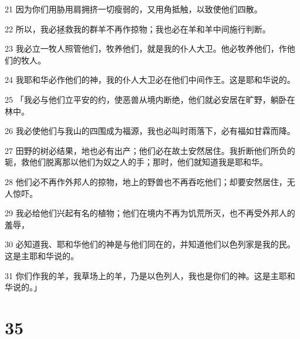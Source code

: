 \par 21 因为你们用胁用肩拥挤一切瘦弱的，又用角抵触，以致使他们四散。
\par 22 所以，我必拯救我的群羊不再作掠物；我也必在羊和羊中间施行判断。
\par 23 我必立一牧人照管他们，牧养他们，就是我的仆人大卫。他必牧养他们，作他们的牧人。
\par 24 我耶和华必作他们的神，我的仆人大卫必在他们中间作王。这是耶和华说的。
\par 25 「我必与他们立平安的约，使恶兽从境内断绝，他们就必安居在旷野，躺卧在林中。
\par 26 我必使他们与我山的四围成为福源，我也必叫时雨落下，必有福如甘霖而降。
\par 27 田野的树必结果，地也必有出产；他们必在故土安然居住。我折断他们所负的轭，救他们脱离那以他们为奴之人的手；那时，他们就知道我是耶和华。
\par 28 他们必不再作外邦人的掠物，地上的野兽也不再吞吃他们；却要安然居住，无人惊吓。
\par 29 我必给他们兴起有名的植物；他们在境内不再为饥荒所灭，也不再受外邦人的羞辱，
\par 30 必知道我、耶和华他们的神是与他们同在的，并知道他们以色列家是我的民。这是主耶和华说的。
\par 31 你们作我的羊，我草场上的羊，乃是以色列人，我也是你们的神。这是主耶和华说的。」

\chapter{35}

